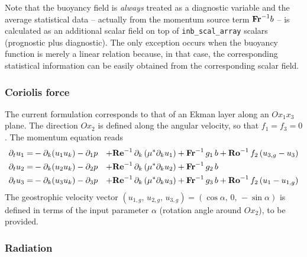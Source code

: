 Note that the buoyancy field is {\it always} treated as a diagnostic variable and the average statistical data -- actually from the momentum source term $\mathrm{\bf Fr}^{-1}b$ -- is calculated as an additional scalar field on top of {\tt   inb\_scal\_array} scalars (prognostic plus diagnostic). The only exception occurs when the buoyancy function is merely a linear relation because, in that case, the corresponding statistical information can be easily obtained from the corresponding scalar field.

\subsubsection{Coriolis force}

The current formulation corresponds to that of an Ekman layer along an $Ox_1x_3$ plane. The direction $Ox_2$ is defined along the angular velocity, so that $f_1=f_3=0$. The momentum equation reads 
\begin{subequations}
    \begin{align}
        \partial_t  u_1 =& -\partial_k ( u_1 u_k ) -\partial_1 p &
        +\mathrm{\bf Re}^{-1}\,\partial_k  \left( \mu^{*} \partial_k u_1\right) &
        +\mathrm{\bf Fr}^{-1}\, g_1\,b +\mathrm{\bf Ro}^{-1}\,f_2\,(u_{3,g}-u_3) \\
        \partial_t  u_2 =& -\partial_k ( u_2 u_k ) -\partial_2 p &
        +\mathrm{\bf Re}^{-1}\,\partial_k  \left( \mu^{*} \partial_k u_2\right) &
        +\mathrm{\bf Fr}^{-1}\, g_2\,b \\
        \partial_t  u_3 =& -\partial_k ( u_3 u_k ) -\partial_3 p &
        +\mathrm{\bf Re}^{-1}\,\partial_k  \left( \mu^{*} \partial_k u_3\right) &
        +\mathrm{\bf Fr}^{-1}\, g_3\,b +\mathrm{\bf Ro}^{-1}\,f_2\,(u_1-u_{1,g})
    \end{align}
\end{subequations}
The geostrophic velocity vector $(u_{1,g},\,u_{2,g},\,u_{3,g}) = (\cos\alpha,\,0,\,-\sin\alpha)$ is defined in terms of the input parameter $\alpha$ (rotation angle around $Ox_2$), to be provided.

\subsubsection{Radiation}

